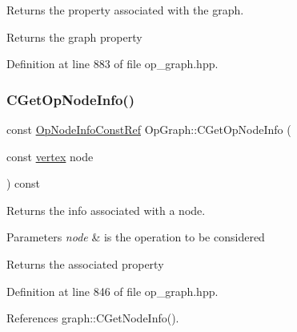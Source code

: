 Returns the property associated with the graph. 

\begin{DoxyReturn}{Returns}
the graph property 
\end{DoxyReturn}


Definition at line 883 of file op\+\_\+graph.\+hpp.

\mbox{\label{structOpGraph_a8743b659d48a1922e75397b47c97bd5c}} 
\subsubsection{\texorpdfstring{C\+Get\+Op\+Node\+Info()}{CGetOpNodeInfo()}}
{\footnotesize\ttfamily const \hyperlink{op__graph_8hpp_a9e7b5806b7d7ea87cc4abe68bf204684}{Op\+Node\+Info\+Const\+Ref} Op\+Graph\+::\+C\+Get\+Op\+Node\+Info (\begin{DoxyParamCaption}\item[{const \hyperlink{graph_8hpp_abefdcf0544e601805af44eca032cca14}{vertex}}]{node }\end{DoxyParamCaption}) const\hspace{0.3cm}{\ttfamily [inline]}}



Returns the info associated with a node. 


\begin{DoxyParams}{Parameters}
{\em node} & is the operation to be considered \\
\hline
\end{DoxyParams}
\begin{DoxyReturn}{Returns}
the associated property 
\end{DoxyReturn}


Definition at line 846 of file op\+\_\+graph.\+hpp.



References graph\+::\+C\+Get\+Node\+Info().



